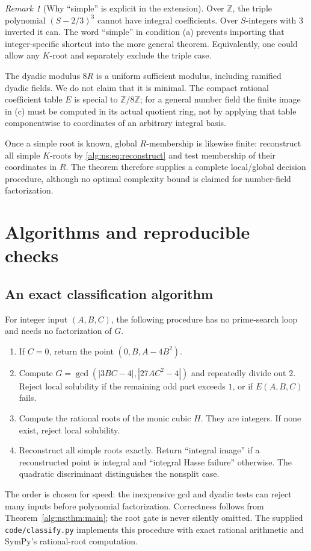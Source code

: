 \documentclass[11pt]{article}
\numberwithin{equation}{section}
\theoremstyle{plain}
\theoremstyle{plain}
\theoremstyle{plain}
\theoremstyle{definition}
\theoremstyle{definition}
\theoremstyle{definition}
\theoremstyle{remark}
\newtheorem{remark}[remark]{Remark}
\newcommand{\Z}{\mathbb Z}\newcommand{\Q}{\mathbb Q}
\newcommand{\rpath}[1]{\nolinkurl{#1}}
\begin{document}
\begin{remark}[Why ``simple'' is explicit in the extension]
Over $\Z$, the triple polynomial $(S-2/3)^3$ cannot have integral
coefficients. Over $S$-integers with $3$ inverted it can. The word
``simple'' in condition (a) prevents importing that integer-specific
shortcut into the more general theorem. Equivalently, one could allow
any $K$-root and separately exclude the triple case.
\end{remark}

The dyadic modulus $8R$ is a uniform sufficient modulus, including
ramified dyadic fields. We do not claim that it is minimal. The compact
rational coefficient table $E$ is special to $\Z/8\Z$; for a general
number field the finite image in (c) must be computed in its actual
quotient ring, not by applying that table componentwise to coordinates
of an arbitrary integral basis.

Once a simple root is known, global $R$-membership is likewise finite:
reconstruct all simple $K$-roots by \eqref{alg:ns:eq:reconstruct} and test
membership of their coordinates in $R$. The theorem therefore supplies
a complete local/global decision procedure, although no optimal
complexity bound is claimed for number-field factorization.

\section{Algorithms and reproducible checks}\label{alg:ns:sec:computation}

\subsection{An exact classification algorithm}
For integer input $(A,B,C)$, the following procedure has no prime-search
loop and needs no factorization of $G$.
\begin{enumerate}[label=\arabic*.]
\item If $C=0$, return the point $(0,B,A-4B^2)$.
\item Compute $G=\gcd(|3BC-4|,|27AC^2-4|)$ and repeatedly divide out $2$.
Reject local solubility if the remaining odd part exceeds $1$, or if
$E(A,B,C)$ fails.
\item Compute the rational roots of the monic cubic $H$. They are
integers. If none exist, reject local solubility.
\item Reconstruct all simple roots exactly. Return ``integral image''
if a reconstructed point is integral and ``integral Hasse failure''
otherwise. The quadratic discriminant distinguishes the nonsplit case.
\end{enumerate}
The order is chosen for speed: the inexpensive gcd and dyadic tests can
reject many inputs before polynomial factorization. Correctness follows
from Theorem~\ref{alg:ns:thm:main}; the root gate is never silently omitted.
The supplied \rpath{code/classify.py} implements this procedure with
exact rational arithmetic and SymPy's rational-root computation.
\end{document}

